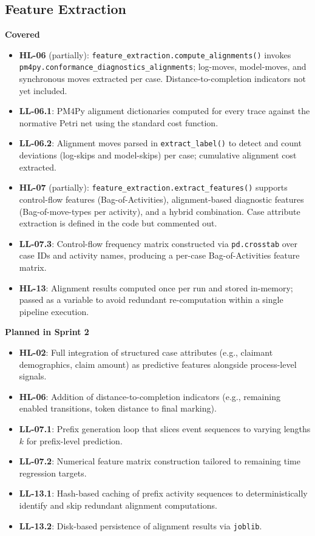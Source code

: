 \documentclass[12pt,a4paper]{article}
\begin{document}
\subsection{Feature Extraction}

\textbf{Covered}
\begin{itemize}
    \item \textbf{HL-06} (partially): \texttt{feature\_extraction.compute\_alignments()} invokes \texttt{pm4py.conformance\_diagnostics\_alignments}; log-moves, model-moves, and synchronous moves extracted per case. Distance-to-completion indicators not yet included.
    \item \textbf{LL-06.1}: PM4Py alignment dictionaries computed for every trace against the normative Petri net using the standard cost function.
    \item \textbf{LL-06.2}: Alignment moves parsed in \texttt{extract\_label()} to detect and count deviations (log-skips and model-skips) per case; cumulative alignment cost extracted.
    \item \textbf{HL-07} (partially): \texttt{feature\_extraction.extract\_features()} supports control-flow features (Bag-of-Activities), alignment-based diagnostic features (Bag-of-move-types per activity), and a hybrid combination. Case attribute extraction is defined in the code but commented out.
    \item \textbf{LL-07.3}: Control-flow frequency matrix constructed via \texttt{pd.crosstab} over case IDs and activity names, producing a per-case Bag-of-Activities feature matrix.
    \item \textbf{HL-13}: Alignment results computed once per run and stored in-memory; passed as a variable to avoid redundant re-computation within a single pipeline execution.
\end{itemize}


\noindent \textbf{Planned in Sprint 2}
\begin{itemize}
    \item \textbf{HL-02}: Full integration of structured case attributes (e.g., claimant demographics, claim amount) as predictive features alongside process-level signals.
    \item \textbf{HL-06}: Addition of distance-to-completion indicators (e.g., remaining enabled transitions, token distance to final marking).
    \item \textbf{LL-07.1}: Prefix generation loop that slices event sequences to varying lengths $k$ for prefix-level prediction.
    \item \textbf{LL-07.2}: Numerical feature matrix construction tailored to remaining time regression targets.
    \item \textbf{LL-13.1}: Hash-based caching of prefix activity sequences to deterministically identify and skip redundant alignment computations.
    \item \textbf{LL-13.2}: Disk-based persistence of alignment results via \texttt{joblib}.
\end{itemize}
\end{document}
